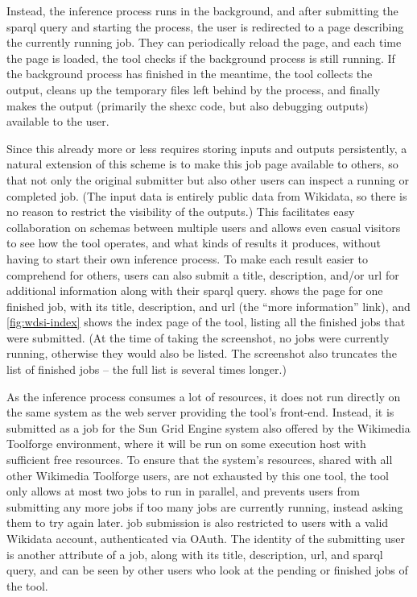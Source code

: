 Instead, the inference process runs in the background,
and after submitting the \gls{sparql} query and starting the process,
the user is redirected to a page describing the currently running \gls{job}.
They can periodically reload the page,
and each time the page is loaded,
the tool checks if the background process is still running.
If the background process has finished in the meantime,
the tool collects the output,
cleans up the temporary files left behind by the process,
and finally makes the output
(primarily the \gls{shexc} code, but also debugging outputs)
available to the user.

Since this already more or less requires storing inputs and outputs persistently,
a natural extension of this scheme is to make this \gls{job} page available to others,
so that not only the original submitter but also other users can inspect a running or completed \gls{job}.
(The input data is entirely public data from \gls{Wikidata},
so there is no reason to restrict the visibility of the outputs.)
This facilitates easy collaboration on \glspl{schema} between multiple users
and allows even casual visitors to see how the tool operates,
and what kinds of results it produces,
without having to start their own inference process.
To make each result easier to comprehend for others,
users can also submit a title, description, and/or \gls{url} for additional information
along with their \gls{sparql} query.
 shows the page for one finished \gls{job},
with its title, description, and \gls{url} (the “more information” link),
and \cref{fig:wdsi-index} shows the index page of the tool,
listing all the finished jobs that were submitted.
(At the time of taking the screenshot,
no jobs were currently running,
otherwise they would also be listed.
The screenshot also truncates the list of finished jobs –
the full list is several times longer.)

As the inference process consumes a lot of resources,
it does not run directly on the same system as the web server providing the tool’s front-end.
Instead, it is submitted as a job for the Sun Grid Engine system also offered by the \gls{Wikimedia Toolforge} environment,
where it will be run on some execution host with sufficient free resources.
To ensure that the system’s resources,
shared with all other \gls{Wikimedia Toolforge} users,
are not exhausted by this one tool,
the tool only allows at most two \glspl{job} to run in parallel,
and prevents users from submitting any more \glspl{job} if too many \glspl{job} are currently running,
instead asking them to try again later.
\Gls{job} submission is also restricted to users with a valid \gls{Wikidata} account,
authenticated via OAuth.
The identity of the submitting user is another attribute of a \gls{job},
along with its title, description, \gls{url}, and \gls{sparql} query,
and can be seen by other users who look at the pending or finished \glspl{job} of the tool.

